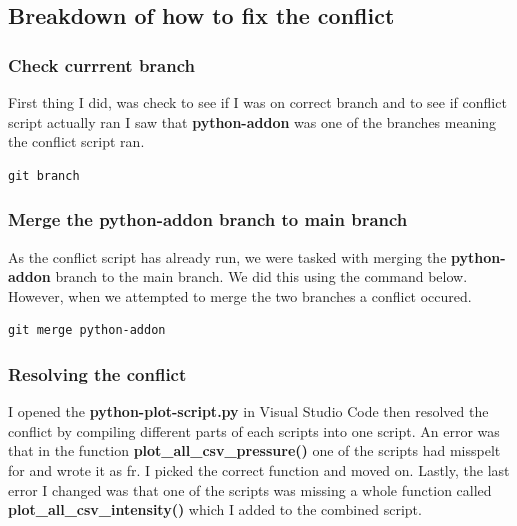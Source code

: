 \documentclass[]{article}
\begin{document}
\subsection{Breakdown of how to fix the conflict}
\subsubsection{Check currrent branch}
First thing I did, was check to see if I was on correct branch and to see if conflict script actually ran
I saw that \textbf{python-addon} was one of the branches meaning the conflict script ran.
\begin{tcolorbox}[colback=white, colframe=black, boxrule=1pt,
    fonttitle=\bfseries, listing only, listing options={language=sh, basicstyle=\ttfamily}]
\begin{verbatim}
git branch
\end{verbatim}
\end{tcolorbox}

\subsubsection{Merge the python-addon branch to main branch}
As the conflict script has already run, we were tasked with merging the \textbf{python-addon} branch to the main
branch. We did this using the command below. However, when we attempted to merge the two branches a conflict occured.
\begin{tcolorbox}[colback=white, colframe=black, boxrule=1pt,
    fonttitle=\bfseries, listing only, listing options={language=sh, basicstyle=\ttfamily}]
\begin{verbatim}
git merge python-addon
\end{verbatim}
\end{tcolorbox}

\subsubsection{Resolving the conflict}
I opened the \textbf{python-plot-script.py} in Visual Studio Code then resolved the conflict by compiling different
parts of each scripts into one script. An error was that in the function \textbf{plot\_all\_csv\_pressure()} one of the scripts had misspelt for and
wrote it as fr. I picked the correct function and moved on. Lastly, the last error I changed was that one of the scripts
was missing a whole function called \textbf{plot\_all\_csv\_intensity()} which I added to the combined script.
\end{document}
